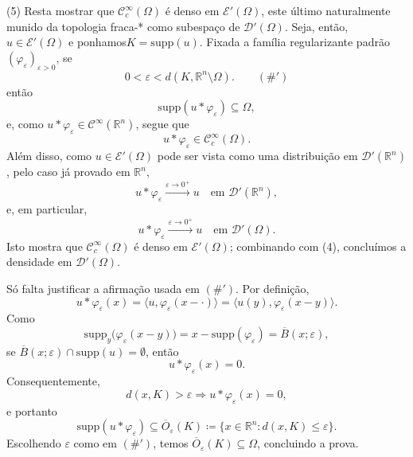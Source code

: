\documentclass[../distribution_theory_notes.tex]{subfiles}
\begin{document}
\begin{proof*}
	(5) Resta mostrar que \(\mathcal{C}_{c}^{\infty}(\Omega )\) é denso em \(\mathcal{E}'(\Omega )\), este último naturalmente munido da topologia fraca-* como subespaço de \(\mathcal{D}'(\Omega )\). Seja, então, \(u\in \mathcal{E}'(\Omega )\) e ponhamos\(K=\mathrm{supp}(u).\)
	Fixada a família regularizante padrão \((\varphi_{\varepsilon })_{\varepsilon >0}\), se
	\[
		0<\varepsilon <d(K,\mathbb{R}^{n}\setminus \Omega ). \qquad (\#')
	\]
	então
	\[
		\mathrm{supp}(u*\varphi_{\varepsilon })\subseteq \Omega ,
	\]
	e, como \(u*\varphi_{\varepsilon }\in \mathcal{C}^{\infty}(\mathbb{R}^{n})\), segue que
	\[
		u*\varphi_{\varepsilon }\in \mathcal{C}_{c}^{\infty}(\Omega ).
	\]
	Além disso, como \(u\in \mathcal{E}'(\Omega )\) pode ser vista como uma distribuição em \(\mathcal{D}'(\mathbb{R}^{n})\), pelo caso já provado em \(\mathbb{R}^{n}\),
	\[
		u*\varphi_{\varepsilon }\stackrel{\varepsilon \to 0^{+}}\longrightarrow u\quad \text{em }\mathcal{D}'(\mathbb{R}^{n}),
	\]
	e, em particular,
	\[
		u*\varphi_{\varepsilon }\stackrel{\varepsilon \to 0^{+}}\longrightarrow u\quad \text{em }\mathcal{D}'(\Omega ).
	\]
	Isto mostra que \(\mathcal{C}_{c}^{\infty}(\Omega )\) é denso em \(\mathcal{E}'(\Omega )\); combinando com (4), concluímos a densidade em \(\mathcal{D}'(\Omega )\).

	Só falta justificar a afirmação usada em \((\#')\). Por definição,
	\[
		u*\varphi_{\varepsilon }(x)=\langle u, \varphi_{\varepsilon }(x-\cdot )\rangle
		=\langle u(y), \varphi_{\varepsilon }(x-y)\rangle.
	\]
	Como
	\[
		\mathrm{supp}_{y}\bigl(\varphi_{\varepsilon }(x-y)\bigr)
		=x-\mathrm{supp}(\varphi_{\varepsilon })
		=\overline{B}(x;\varepsilon ),
	\]
	se \(\overline{B}(x;\varepsilon )\cap \mathrm{supp}(u)=\emptyset \), então
	\[
		u*\varphi_{\varepsilon }(x)=0.
	\]
	Consequentemente,
	\[
		d(x,K)>\varepsilon \Rightarrow u*\varphi_{\varepsilon }(x)=0,
	\]
	e portanto
	\[
		\mathrm{supp}(u*\varphi_{\varepsilon })\subseteq \overline{O}_{\varepsilon }(K)
		\coloneqq \{x\in \mathbb{R}^{n}:d(x,K)\leq \varepsilon \}.
	\]
	Escolhendo \(\varepsilon \) como em \((\#')\), temos \(\overline{O}_{\varepsilon }(K)\subseteq \Omega \), concluindo a prova. \qedsymbol
\end{proof*}
\end{document}
